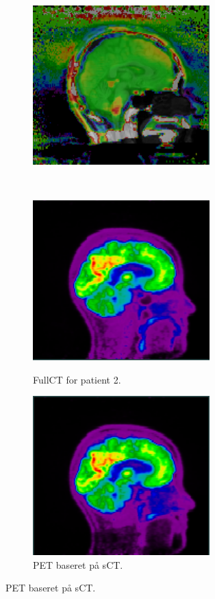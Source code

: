 \begin{figure}
\begin{subfigure}[b]{0.3\textwidth}
        \includegraphics[width=0.75\textwidth]{colager/loocv_pet/loocv_010476_pet_pd.png}
        \label{col:loocv_pet_pat1_pd}
    \end{subfigure}\\
    \begin{subfigure}[b]{0.3\textwidth}
        \caption{FullCT for patient 2.}
        \includegraphics[width=0.75\textwidth]{colager/loocv_pet/loocv_010769_pet_ct.png}
        \label{col:loocv_pet_pat2_ct}
    \end{subfigure}\hfill
    \begin{subfigure}[b]{0.3\textwidth}
        \caption{PET baseret på sCT.}
        \includegraphics[width=0.75\textwidth]{colager/loocv_pet/loocv_010769_pet_sct.png}

\end{subfigure}
\end{figure}
